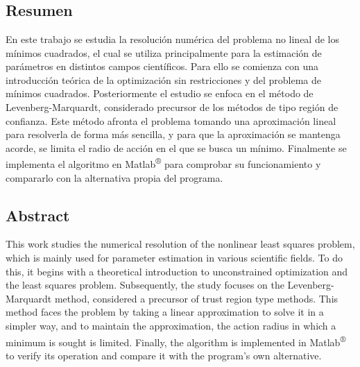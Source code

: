 \documentclass[11pt,a4paper]{book}
\theoremstyle{definition}
\theoremstyle{remark}
\begin{document}

{}		
\chapter*{}

\section*{Resumen}

En este trabajo se estudia la resolución numérica del problema no lineal de los mínimos cuadrados, el cual se utiliza principalmente
para la estimación de parámetros en distintos campos científicos. Para ello se comienza con una introducción teórica de la optimización sin restricciones y del problema de mínimos cuadrados. Posteriormente el estudio se enfoca en el método de Levenberg-Marquardt, considerado precursor de los métodos de tipo región de confianza. Este método afronta el problema tomando una aproximación lineal para resolverla de forma más sencilla, y para que la aproximación se mantenga acorde, se limita el radio de acción en el que se busca un mínimo. Finalmente se implementa el algoritmo en Matlab\textsuperscript{®} para comprobar su funcionamiento y compararlo con la alternativa propia del programa.



\vspace{1.5cm}

\section*{Abstract}


This work studies the numerical resolution of the nonlinear least squares problem, which is mainly used for parameter estimation in various scientific fields. To do this, it begins with a theoretical introduction to unconstrained optimization and the least squares problem. Subsequently, the study focuses on the Levenberg-Marquardt method, considered a precursor of trust region type methods. This method faces the problem by taking a linear approximation to solve it in a simpler way, and to maintain the approximation, the action radius in which a minimum is sought is limited. Finally, the algorithm is implemented in Matlab\textsuperscript{®} to verify its operation and compare it with the program's own alternative.
\end{document}
